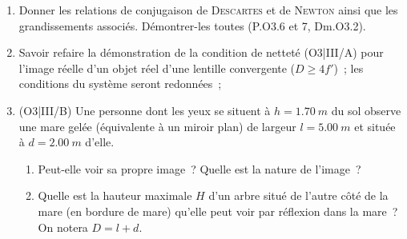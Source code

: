 \documentclass[a4paper, 12pt, final, garamond]{book}
\begin{document}
\begin{enumerate}
	\item Donner les relations de conjugaison de \textsc{Descartes} et de
	      \textsc{Newton} ainsi que les grandissements associés. Démontrer-les
	      toutes (P.O3.6 et 7, Dm.O3.2).


	\item Savoir refaire la démonstration de la condition de netteté (O3|III/A)
	      pour l'image réelle d'un objet réel d'une lentille convergente ($D \geq
		      4f'$)~; les conditions du système seront redonnées~;

	\item \leavevmode%
	      (O3|III/B) Une personne dont les yeux se situent à $h = \SI{1.70}{m}$ du
	      sol observe une mare gelée (équivalente à un miroir plan) de largeur $l
		      = \SI{5.00}{m}$ et située à $d = \SI{2.00}{m}$ d'elle.
	      \begin{enumerate}
		      \item Peut-elle voir sa propre image~? Quelle est la nature de
		            l'image~?
		      \item Quelle est la hauteur maximale $H$ d'un arbre situé de l'autre
		            côté de la mare (en bordure de mare) qu'elle peut voir par réflexion
		            dans la mare~? On notera $D = l+d$.
	      \end{enumerate}

\end{enumerate}
\end{document}
